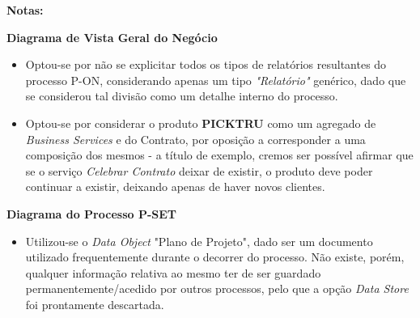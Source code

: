 \documentclass[12pt,a4paper]{article}
\begin{document}
\begin{tcolorbox}[enhanced jigsaw,colback=bg,boxrule=0pt,arc=4pt]
  \begin{large}
    \textbf{Notas:}
  \end{large}

  \begin{small}
    \textbf{Diagrama de Vista Geral do Negócio}
  \end{small}
  \begin{itemize}
    \item Optou-se por não se explicitar todos os tipos de relatórios resultantes do processo P-ON,
          considerando apenas um tipo \textit{"Relatório"} genérico, dado que se considerou tal
          divisão como um detalhe interno do processo.
    \item Optou-se por considerar o produto \textbf{PICKTRU} como um agregado de
          \textit{Business Services} e do Contrato, por oposição a corresponder a uma
          composição dos mesmos - a título de exemplo, cremos ser possível afirmar que
          se o serviço \textit{Celebrar Contrato} deixar de existir, o produto deve poder
          continuar a existir, deixando apenas de haver novos clientes.
  \end{itemize}

  \begin{small}
    \textbf{Diagrama do Processo P-SET}
  \end{small}
  \begin{itemize}
    \item Utilizou-se o \textit{Data Object} "Plano de Projeto", dado ser um documento
          utilizado frequentemente durante o decorrer do processo.
          Não existe, porém, qualquer informação relativa ao mesmo ter de ser guardado permanentemente/acedido
          por outros processos, pelo que a opção \textit{Data Store} foi prontamente descartada.
  \end{itemize}


\end{tcolorbox}
\end{document}
